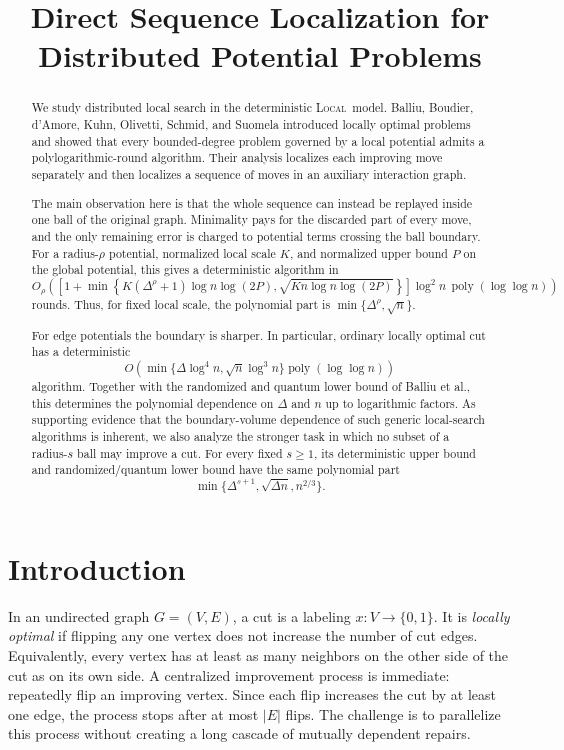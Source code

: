 \documentclass[11pt]{article}
\title{Direct Sequence Localization for Distributed Potential Problems}
\author{}
\date{}
\theoremstyle{definition}
\theoremstyle{remark}
\newcommand{\poly}{\operatorname{poly}}
\newcommand{\LOCAL}{\textnormal{\textsc{Local}}}
\begin{document}
\maketitle
\vspace{-2.5em}

\begin{abstract}
We study distributed local search in the deterministic \LOCAL\ model.  Balliu,
Boudier, d'Amore, Kuhn, Olivetti, Schmid, and Suomela introduced locally optimal
problems and showed that every bounded-degree problem governed by a local potential
admits a polylogarithmic-round algorithm.  Their analysis localizes each improving
move separately and then localizes a sequence of moves in an auxiliary interaction
graph.

The main observation here is that the whole sequence can instead be replayed inside
one ball of the original graph.  Minimality pays for the discarded part of every
move, and the only remaining error is charged to potential terms crossing the ball
boundary.  For a radius-$\rho$ potential, normalized local scale $K$, and normalized
upper bound $P$ on the global potential, this gives a deterministic algorithm in
\[
 O_{\rho}\!\left(
 \left[1+\min\left\{
 K(\Delta^\rho+1)\log n\log(2P),
 \sqrt{Kn\log n\log(2P)}
 \right\}\right]
 \log^2 n\,\poly(\log\log n)
 \right)
\]
rounds.  Thus, for fixed local scale, the polynomial part is
$\min\{\Delta^\rho,\sqrt n\}$.

For edge potentials the boundary is sharper.  In particular, ordinary locally
optimal cut has a deterministic
\[
 O\!\left(\min\{\Delta\log^4 n,\sqrt n\log^3 n\}
 \poly(\log\log n)\right)
\]
algorithm.  Together with the randomized and quantum lower bound of Balliu et al.,
this determines the polynomial dependence on $\Delta$ and $n$ up to logarithmic
factors.  As supporting evidence that the boundary-volume dependence of such generic
local-search algorithms is inherent, we also analyze the stronger task in which no
subset of a radius-$s$ ball may improve a cut.  For every fixed $s\geq 1$, its
deterministic upper bound and randomized/quantum lower bound have the same polynomial
part
\[
 \min\{\Delta^{s+1},\sqrt{\Delta n},n^{2/3}\}.
\]
\end{abstract}

\section{Introduction}

In an undirected graph $G=(V,E)$, a cut is a labeling $x:V\to\{0,1\}$.
It is \emph{locally optimal} if flipping any one vertex does not increase the
number of cut edges.  Equivalently, every vertex has at least as many neighbors on
the other side of the cut as on its own side.  A centralized improvement process is
immediate: repeatedly flip an improving vertex.  Since each flip increases the cut
by at least one edge, the process stops after at most $|E|$ flips.  The challenge is
to parallelize this process without creating a long cascade of mutually dependent
repairs.
\end{document}
